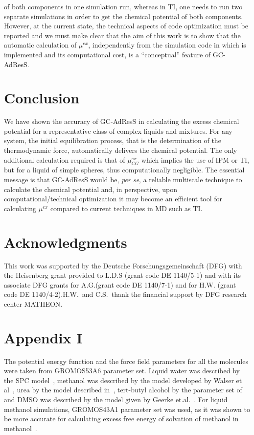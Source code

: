 \documentclass[a4paper,preprint,unsortedaddress]{revtex4-1}
\begin{document}
of both components in one simulation run, whereas in TI, one needs to run two separate simulations in order to get the chemical potential of both components.
However, at the current state, the technical aspects of code optimization must be reported and we must make clear that the aim of this work is to show that  the automatic calculation of $\mu^{ex}$, independently from the simulation code in which is implemented and its computational cost, is a ``conceptual'' feature of GC-AdResS.
  
\section*{Conclusion} 
We have shown the accuracy of GC-AdResS in calculating the excess chemical potential for a representative class of complex liquids and mixtures. 
For any system, the initial equilibration process, that is the determination of the thermodynamic force, automatically delivers the chemical potential. The only additional calculation required is that of $\mu^{ex}_{CG}$ which implies the use of IPM or TI, but for a liquid of simple spheres, thus computationally negligible.  
The essential message is that GC-AdResS would be, {\it per se}, a reliable multiscale technique to calculate the chemical potential and, in perspective, upon computational/technical optimization it may become an efficient tool for calculating $\mu^{ex}$ compared to current techniques in MD such as TI. 

\section*{Acknowledgments}
This work was supported by the Deutsche Forschungsgemeinschaft (DFG) with the Heisenberg grant provided to L.D.S (grant code DE 1140/5-1) and with its associate DFG grants for A.G.(grant code DE 1140/7-1) and for H.W. (grant code DE 1140/4-2).H.W.~and C.S.~thank the financial support by DFG research center MATHEON.

\section*{Appendix I}
The potential energy function and the force field parameters for all the molecules
were taken from GROMOS53A6 parameter set. Liquid water was described by the SPC
model~\cite{spc}, methanol was described by the model developed by Walser et al~\cite{walser},
urea by the model described in~\cite{urea}, tert-butyl alcohol by the parameter set of~\cite{tba}
and DMSO was described by the model given by Geerke et.al.~\cite{dmso1}. For liquid methanol simulations, 
GROMOS43A1 parameter set was used, as it was shown to be more accurate for calculating excess free energy of 
solvation of methanol in methanol~\cite{vang}. 
\end{document}
